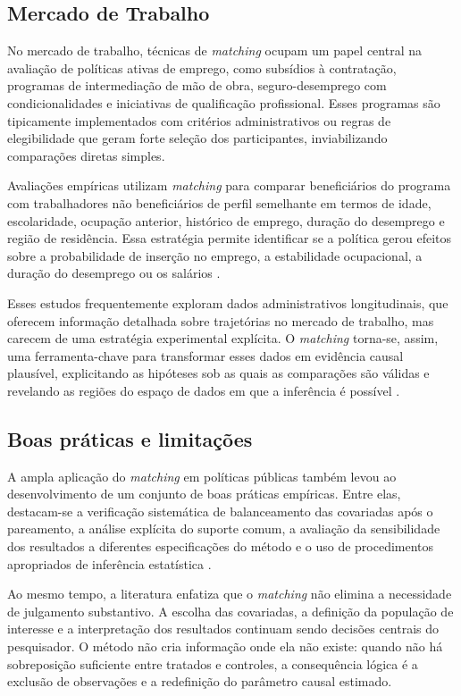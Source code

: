 \subsection*{Mercado de Trabalho}

No mercado de trabalho, técnicas de \textit{matching} ocupam um papel central na avaliação de políticas ativas de emprego, como subsídios à contratação, programas de intermediação de mão de obra, seguro-desemprego com condicionalidades e iniciativas de qualificação profissional. Esses programas são tipicamente implementados com critérios administrativos ou regras de elegibilidade que geram forte seleção dos participantes, inviabilizando comparações diretas simples.

Avaliações empíricas utilizam \textit{matching} para comparar beneficiários do programa com trabalhadores não beneficiários de perfil semelhante em termos de idade, escolaridade, ocupação anterior, histórico de emprego, duração do desemprego e região de residência. Essa estratégia permite identificar se a política gerou efeitos sobre a probabilidade de inserção no emprego, a estabilidade ocupacional, a duração do desemprego ou os salários \citep{heckman1998characterizing, caliendo2008some}.

Esses estudos frequentemente exploram dados administrativos longitudinais, que oferecem informação detalhada sobre trajetórias no mercado de trabalho, mas carecem de uma estratégia experimental explícita. O \textit{matching} torna-se, assim, uma ferramenta-chave para transformar esses dados em evidência causal plausível, explicitando as hipóteses sob as quais as comparações são válidas e revelando as regiões do espaço de dados em que a inferência é possível \citep{lechner2011matching}.

\subsection*{Boas práticas e limitações}

A ampla aplicação do \textit{matching} em políticas públicas também levou ao desenvolvimento de um conjunto de boas práticas empíricas. Entre elas, destacam-se a verificação sistemática de balanceamento das covariadas após o pareamento, a análise explícita do suporte comum, a avaliação da sensibilidade dos resultados a diferentes especificações do método e o uso de procedimentos apropriados de inferência estatística \citep{abadie2006large}.

Ao mesmo tempo, a literatura enfatiza que o \textit{matching} não elimina a necessidade de julgamento substantivo. A escolha das covariadas, a definição da população de interesse e a interpretação dos resultados continuam sendo decisões centrais do pesquisador. O método não cria informação onde ela não existe: quando não há sobreposição suficiente entre tratados e controles, a consequência lógica é a exclusão de observações e a redefinição do parâmetro causal estimado.

